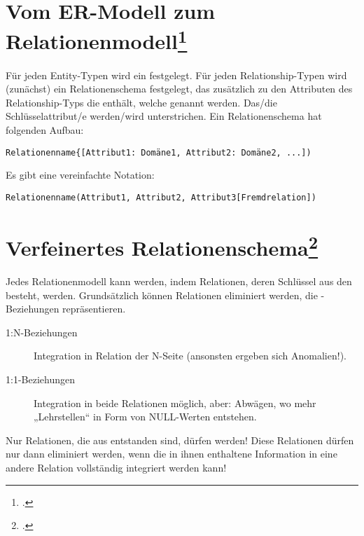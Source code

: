 \documentclass{lehramt-informatik}
\begin{document}
\section{Vom ER-Modell zum Relationenmodell\footcite[Seite 33]{db:fs:1}}

Für jeden Entity-Typen wird ein  festgelegt.
%
Für jeden Relation\-ship-Typen wird (zunächst) ein Relationenschema
festgelegt, das zusätzlich zu den Attributen des Relationship-Typs die
 enthält, welche
 genannt werden. Das/die Schlüsselattribut/e
werden/wird unterstrichen.
%
Ein Relationenschema hat folgenden Aufbau:

\begin{center}
\texttt{Relationenname\{[Attribut1: Domäne1, Attribut2: Domäne2, ...])}
\end{center}

\noindent
Es gibt eine vereinfachte Notation:

\begin{center}
\texttt{Relationenname(Attribut1, Attribut2, Attribut3[Fremdrelation])}
\end{center}

%

\section{Verfeinertes Relationenschema\footcite[Seite 34]{db:fs:1}}

Jedes Relationenmodell kann  werden, indem Relationen,
deren Schlüssel aus den  besteht,
 werden.
Grundsätzlich können  Relationen eliminiert werden,
die -Beziehungen repräsentieren.

\begin{description}
\item[1:N-Beziehungen] Integration in Relation der N-Seite (ansonsten
ergeben sich Anomalien!).

\item[1:1-Beziehungen] Integration in beide Relationen möglich, aber:
Abwägen, wo mehr „Lehrstellen“ in Form von NULL-Werten entstehen.
\end{description}

\noindent
Nur Relationen, die aus  entstanden sind,
dürfen  werden! Diese Relationen dürfen nur dann
eliminiert werden, wenn die in ihnen enthaltene Information in eine
andere Relation vollständig integriert werden kann!
\end{document}
